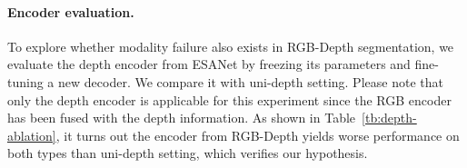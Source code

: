 \paragraph{Encoder evaluation.} To explore whether modality failure also exists in RGB-Depth segmentation, we evaluate the depth encoder from ESANet\cite{seichter2020efficient} by freezing its parameters and fine-tuning a new decoder. We compare it with uni-depth setting. Please note that only the depth encoder is applicable for this experiment since the RGB encoder has been fused with the depth information. As shown in Table~\ref{tb:depth-ablation}, it turns out the encoder from RGB-Depth yields worse performance on both types than uni-depth setting, which verifies our hypothesis.
